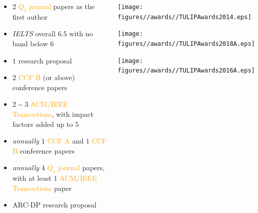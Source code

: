\documentclass{tikzposter} %
\begin{document}
\begin{columns}
{\begin{minipage}[l]{0.45\linewidth}
\begin{description}[font=\small]
\begin{description}[font=\small]
\begin{itemize}
							\footnotesize \item $2$ \textcolor{orange}{$Q_1$ journal} papers as the first author
							\item \textit{IELTS} overall $6.5$ with no band below $6$
						\end{itemize}
					\end{description}
					\item[PhD Students] \hfill
					\begin{itemize}
						\footnotesize \item $1$ research proposal
						\item $2$ \textcolor{orange}{CCF B} (or above) conference papers
						\item $2$ \textasciitilde{} $3$ \textcolor{orange}{ACM/IEEE Transactions},
						with impact factors added up to $5$
					\end{itemize}
					\item[Post-doctoral Research Fellows] \hfill
					\begin{itemize}
						\footnotesize \item \textit{annually} $1$ \textcolor{orange}{CCF A} and $1$ \textcolor{orange}{CCF B} conference papers
						\item \textit{annually} $4$ \textcolor{orange}{$Q_1$ journal} papers,
						with at least $1$ \textcolor{orange}{ACM/IEEE Transactions} paper
						\item ARC-DP research proposal
					\end{itemize}
					
				\end{description}		
			\end{minipage}
			


			
		}
		
		{
			\begin{minipage}{\linewidth}
				\begin{multicols}{3}
				\centering
				\begin{minipage}{\linewidth}
					\centering
					\texttt{[image: figures//awards//TULIPAwards2014.eps]}
				\end{minipage}
				
				\begin{minipage}{\linewidth}
					\texttt{[image: figures//awards//TULIPAwards2018A.eps]}
				\end{minipage}	
				\hspace{-5.6cm}
				\begin{minipage}{\linewidth}
					\texttt{[image: figures//awards//TULIPAwards2016A.eps]}
				\end{minipage}				
				\end{multicols}
			\end{minipage}
			
}
\end{columns}
\end{document}
